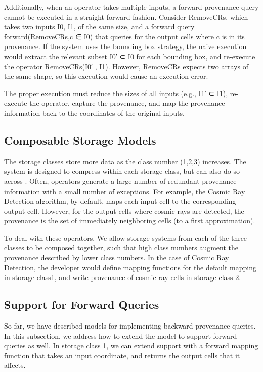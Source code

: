 Additionally, when an operator takes multiple inputs, a forward provenance query cannot be executed in a straight forward fashion. Consider RemoveCRs, which takes two inputs I0, I1, of the same size, and a forward query forward(RemoveCRs,c ∈ I0) that queries for the output cells where c is in its provenance. If the system uses the bounding box strategy, the naive execution would extract the relevant subset I0′ ⊂ I0 for each bounding box, and re-execute the operator RemoveCRs(I0′ , I1). However, RemoveCRs expects two arrays of the same shape, so this execution would cause an execution error.


The proper execution must reduce the sizes of all inputs (e.g., I1′ ⊂ I1), re-execute the operator, capture the provenance, and map the provenance information back to the coordinates of the original inputs.

\subsection{Composable Storage Models}

The storage classes store more data as the class number (1,2,3) increases. The system is designed to compress within each storage class, but can also do so across . Often, operators generate a large number of redundant provenance information with a small number of exceptions. For example, the Cosmic Ray Detection algorithm, by default, maps each input cell to the corresponding output cell. However, for the output cells where cosmic rays are detected, the provenance is the set of immediately neighboring cells (to a first approximation).

To deal with these operators, We allow storage systems from each of the three classes to be composed together, such that high class numbers augment the provenance described by lower class numbers. In the case of Cosmic Ray Detection, the developer would define mapping functions for the default mapping in storage class1, and write provenance of cosmic ray cells in storage class 2.


\subsection{Support for Forward Queries}

So far, we have described models for implementing backward provenance queries. In this subsection, we address how to extend the model to support forward queries as well.
In storage class 1, we can extend support with a forward mapping function that takes an input coordinate, and returns the output cells that it affects.


